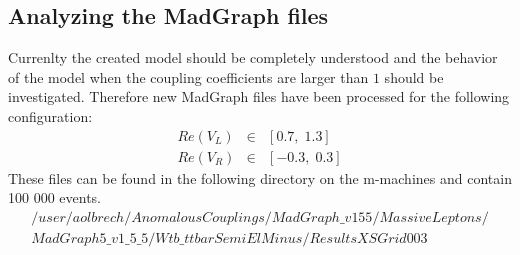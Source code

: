 \subsection{Analyzing the MadGraph files}\label{subsec:MadGraphFiles}
Currenlty the created model should be completely understood and the behavior of the model when the coupling coefficients are larger than $1$ should be investigated. Therefore new MadGraph files have been processed for the following configuration:
\begin{eqnarray*}
  Re(V_L) & \in & \left[  0.7, \; 1.3\right] \\
  Re(V_R) & \in & \left[ -0.3, \; 0.3\right]
\end{eqnarray*}
These files can be found in the following directory on the m-machines and contain 100 000 events.
\begin{eqnarray*}
  /user/aolbrech/AnomalousCouplings/MadGraph\_v155/MassiveLeptons/\\ MadGraph5\_v1\_5\_5/Wtb\_ttbarSemiElMinus/ResultsXSGrid003
\end{eqnarray*}



